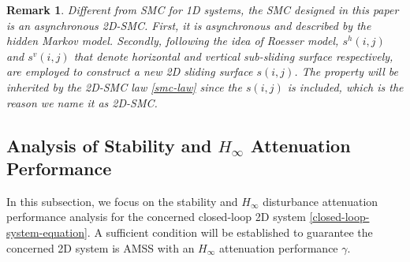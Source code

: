 \documentclass[conference]{IEEEtran}
\newtheorem{remark}{Remark}
\begin{document}
\begin{remark}
	Different from SMC for 1D systems, the SMC designed in this paper is an asynchronous 2D-SMC. First, it is asynchronous and described by the hidden Markov model. Secondly, following the idea of Roesser model, $s^{h}(i,j)$ and $s^{v}(i,j)$ that denote horizontal and vertical sub-sliding surface respectively, are employed to construct a new 2D sliding surface $s(i,j)$. The property will be inherited by the 2D-SMC law \eqref{smc-law} since the $s(i,j)$ is included, which is the reason we name it as 2D-SMC.
\end{remark}


	
\subsection{Analysis of Stability and $H_{\infty}$ Attenuation Performance } \label{stability&H_infty}
 In this subsection, we focus on the stability and $H_{\infty}$ disturbance attenuation performance analysis for the concerned closed-loop 2D system \eqref{closed-loop-system-equation}. A sufficient condition will be established to guarantee the concerned 2D system is  AMSS with an $H_{\infty}$ attenuation performance $\gamma$.
\end{document}
